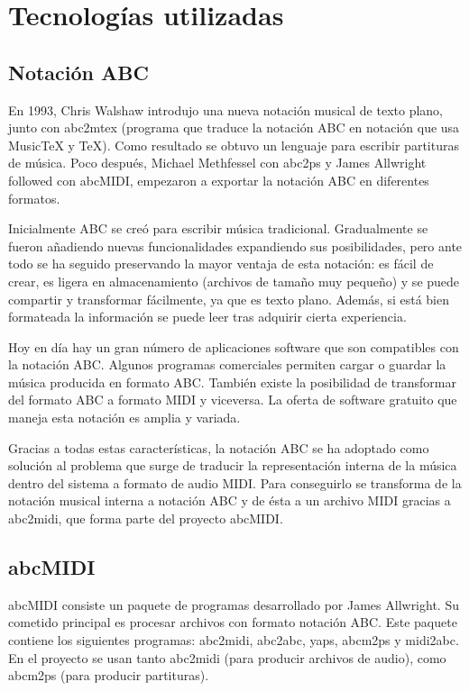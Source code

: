 \chapter{Tecnologías utilizadas}
\label{chap:techs}

\section{Notación ABC}
\label{sec:NotacionABC}

En 1993, Chris Walshaw introdujo una nueva notación musical de texto plano, junto con abc2mtex (programa que traduce la notación ABC en notación que usa MusicTeX y TeX). Como resultado se obtuvo un lenguaje para escribir partituras de música. Poco después, Michael Methfessel con abc2ps y James Allwright followed con abcMIDI, empezaron a exportar la notación ABC en diferentes formatos.

Inicialmente ABC se creó para escribir música tradicional. Gradualmente se fueron añadiendo nuevas funcionalidades expandiendo sus posibilidades, pero ante todo se ha seguido preservando la mayor ventaja de esta notación: es fácil de crear, es ligera en almacenamiento (archivos de tamaño muy pequeño) y se puede compartir y transformar fácilmente, ya que es texto plano. Además, si está bien formateada la información se puede leer tras adquirir cierta experiencia.

Hoy en día hay un gran número de aplicaciones software que son compatibles con la notación ABC. Algunos programas comerciales permiten cargar o guardar la música producida en formato ABC. También existe la posibilidad de transformar del formato ABC a formato MIDI y viceversa. La oferta de software gratuito que maneja esta notación es amplia y variada. 

Gracias a todas estas características, la notación ABC se ha adoptado como solución al problema que surge de traducir la representación interna de la música dentro del sistema a formato de audio MIDI. Para conseguirlo se transforma de la notación musical interna a notación ABC y de ésta a un archivo MIDI gracias a abc2midi, que forma parte del proyecto abcMIDI.

\section{abcMIDI}
\label{sec:abcMIDI}

abcMIDI consiste un paquete de programas desarrollado por James Allwright. Su cometido principal es procesar archivos con formato notación ABC. Este paquete contiene los siguientes programas: abc2midi, abc2abc, yaps, abcm2ps y midi2abc. En el proyecto se usan tanto abc2midi (para producir archivos de audio), como abcm2ps (para producir partituras).

